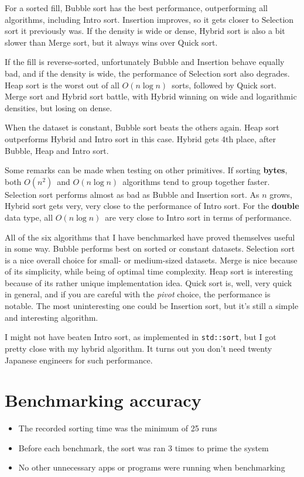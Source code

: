 \documentclass[11pt, a4paper]{article}
\newcommand{\Onn}{$O(n^2)$}
\newcommand{\Onlogn}{$O(n \log n)$}
\begin{document}
\newpage
For a sorted fill, Bubble sort has the best performance, outperforming all algorithms, including Intro sort. Insertion improves, so it gets closer to Selection sort it previously was. If the density is wide or dense, Hybrid sort is also a bit slower than Merge sort, but it always wins over Quick sort.

If the fill is reverse-sorted, unfortunately Bubble and Insertion behave equally bad, and if the density is wide, the performance of Selection sort also degrades. Heap sort is the worst out of all \Onlogn\ sorts, followed by Quick sort. Merge sort and Hybrid sort battle, with Hybrid winning on wide and logarithmic densities, but losing on dense.

When the dataset is constant, Bubble sort beats the others again. Heap sort outperforms Hybrid and Intro sort in this case. Hybrid gets 4th place, after Bubble, Heap and Intro sort.

Some remarks can be made when testing on other primitives. If sorting \textbf{bytes}, both \Onn\ and \Onlogn\ algorithms tend to group together faster. Selection sort performs almost as bad as Bubble and Insertion sort. As $n$ grows, Hybrid sort gets very, very close to the performance of Intro sort. For the \textbf{double} data type, all \Onlogn\ are very close to Intro sort in terms of performance.

\medskip

All of the six algorithms that I have benchmarked have proved themselves useful in some way. Bubble performs best on sorted or constant datasets. Selection sort is a nice overall choice for small- or medium-sized datasets. Merge is nice because of its simplicity, while being of optimal time complexity. Heap sort is interesting because of its rather unique implementation idea. Quick sort is, well, very quick in general, and if you are careful with the \textit{pivot} choice, the performance is notable. The most uninteresting one could be Insertion sort, but it's still a simple and interesting algorithm.

I might not have beaten Intro sort, as implemented in \texttt{std::sort}, but I got pretty close with my hybrid algorithm. It turns out you don't need twenty Japanese engineers for such performance.




\newpage
\section{Benchmarking accuracy}
\begin{itemize}
    \item The recorded sorting time was the minimum of 25 runs
    \item Before each benchmark, the sort was ran 3 times to prime the system
    \item No other unnecessary apps or programs were running when benchmarking
\end{itemize}
\end{document}
